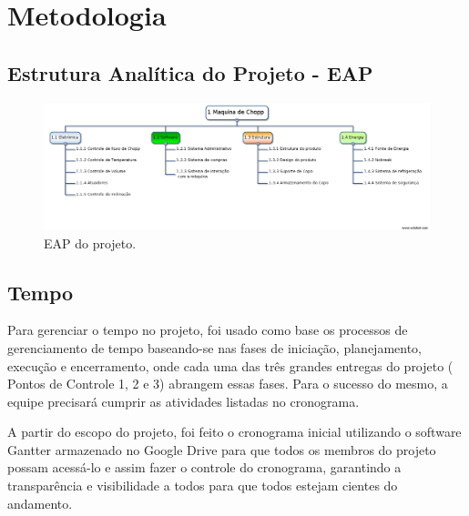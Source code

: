 \chapter[Metodologia]{Metodologia}

	\section[Estrutura Analítica do Projeto - EAP]{Estrutura Analítica do Projeto - EAP}

	\begin{figure}[H]
		\centering
		\includegraphics[scale= 0.4]{figuras/eap.png}
		\caption{EAP do projeto.}
		\label{eap}
	\end{figure}

	\section[Tempo]{Tempo}
		Para gerenciar o tempo no projeto, foi usado como base os processos de gerenciamento de tempo baseando-se nas 
		fases de iniciação, planejamento, execução e encerramento, onde cada uma das três grandes entregas do projeto (
		Pontos de Controle 1, 2 e 3) abrangem essas fases. Para o sucesso do mesmo, a equipe precisará cumprir as 
		atividades listadas no cronograma.

		A partir do escopo do projeto, foi feito o cronograma inicial utilizando o software Gantter armazenado no 
		Google Drive para que todos os membros do projeto possam acessá-lo e assim fazer o controle do cronograma, 
		garantindo a transparência e visibilidade a todos para que todos estejam cientes do andamento.

